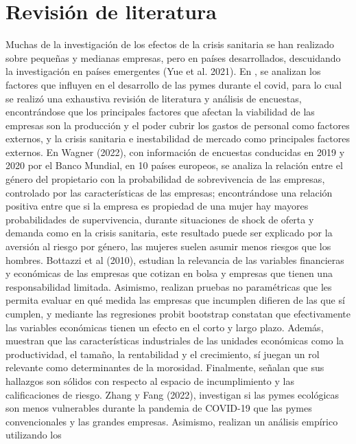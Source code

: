 \documentclass[12pt]{article}
\begin{document}
        \section{Revisión de literatura}
        Muchas de la investigación de los efectos de la crisis sanitaria se han realizado sobre pequeñas y medianas
        empresas, pero en países desarrollados, descuidando la investigación en países emergentes (Yue et al. 2021).
        En \cite{Gamboa}, se analizan los factores que influyen en el desarrollo de las pymes durante el covid,
        para lo cual se realizó una exhaustiva revisión de literatura y análisis de encuestas, encontrándose que los
        principales factores que afectan la viabilidad de las empresas son la producción y el poder cubrir los gastos de
        personal como factores externos, y la crisis sanitaria e inestabilidad de mercado como principales factores externos.
        En Wagner (2022), con información de encuestas conducidas en 2019 y 2020 por el  Banco Mundial, en 10 países europeos,
        se analiza la relación entre el género del propietario con la probabilidad de sobrevivencia de las empresas,
        controlado por las características de las empresas; encontrándose una relación positiva entre que si la empresa
        es propiedad de una mujer hay mayores probabilidades de supervivencia, durante situaciones de shock de oferta y
        demanda como en la crisis sanitaria, este resultado puede ser explicado por la aversión al riesgo por género,
        las mujeres suelen asumir menos riesgos que los hombres.
        Bottazzi et al (2010), estudian la relevancia de las variables financieras y económicas de las empresas que
        cotizan en bolsa y empresas que tienen una responsabilidad limitada. Asimismo, realizan pruebas no paramétricas
        que les permita evaluar en qué medida las empresas que incumplen difieren de las que sí cumplen, y mediante
        las regresiones probit bootstrap constatan que efectivamente las variables económicas tienen un efecto en el
        corto y largo plazo. Además, muestran que las características industriales de las unidades económicas como la
        productividad, el tamaño, la rentabilidad y el crecimiento, sí juegan un rol relevante como determinantes de
        la morosidad. Finalmente, señalan que sus hallazgos son sólidos con respecto al espacio de incumplimiento y
        las calificaciones de riesgo.
        Zhang y Fang (2022), investigan si las pymes ecológicas son menos vulnerables durante la pandemia de COVID-19
        que las pymes convencionales y las grandes empresas. Asimismo, realizan un análisis empírico utilizando los
\end{document}
